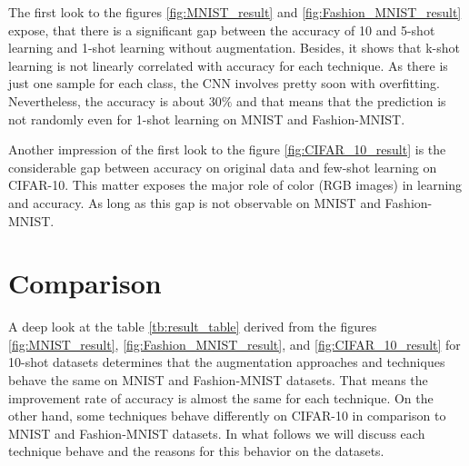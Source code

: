The first look to the figures \ref{fig:MNIST_result} and \ref{fig:Fashion_MNIST_result} expose, that there is
a significant gap between the accuracy of 10 and 5-shot learning and 1-shot learning without augmentation. Besides,
it shows that k-shot learning is not linearly correlated with accuracy for each technique. As there is
just one sample for each class, the CNN involves pretty soon with overfitting. Nevertheless, the
accuracy is about $30\%$ and that means that the prediction is not randomly even for 1-shot
learning on MNIST and Fashion-MNIST.

Another impression of the first look to the figure \ref{fig:CIFAR_10_result} is the considerable gap
between accuracy on original data and few-shot learning on CIFAR-10. This matter exposes the major
role of color (RGB images) in learning and accuracy. As long as this gap is not observable on MNIST
and Fashion-MNIST.

\section{Comparison}

A deep look at the table \ref{tb:result_table} derived from the figures \ref{fig:MNIST_result}, \ref{fig:Fashion_MNIST_result}, and
\ref{fig:CIFAR_10_result} for 10-shot datasets determines that the augmentation approaches and techniques behave the same on MNIST and Fashion-MNIST datasets. That means the improvement rate of accuracy is almost the same for each technique. On the other hand, some techniques behave differently on CIFAR-10 in comparison to MNIST and Fashion-MNIST datasets. In what follows we will discuss each technique behave and the reasons for this behavior on the datasets. 

